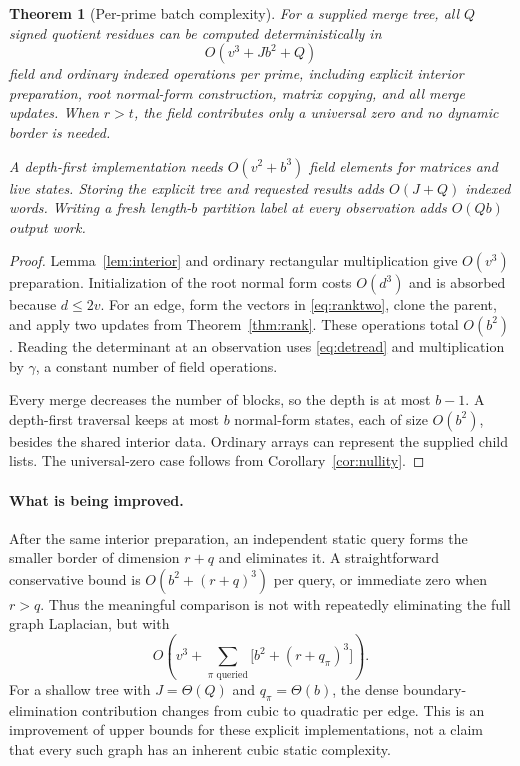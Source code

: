 \documentclass[11pt,letterpaper]{article}
\newtheorem{theorem}{Theorem}[section]
\theoremstyle{definition}\newtheorem{definition}[theorem]{Definition}
\theoremstyle{remark}\newtheorem{remark}[theorem]{Remark}
\begin{document}
\begin{theorem}[Per-prime batch complexity]
\label{thm:batch}
For a supplied merge tree, all $Q$ signed quotient residues can be computed deterministically in
\begin{equation}
 O(v^3+Jb^2+Q)
 \label{eq:batch}
\end{equation}
field and ordinary indexed operations per prime, including explicit interior preparation, root normal-form construction, matrix copying, and all merge updates. When $r>t$, the field contributes only a universal zero and no dynamic border is needed.

A depth-first implementation needs $O(v^2+b^3)$ field elements for matrices and live states. Storing the explicit tree and requested results adds $O(J+Q)$ indexed words. Writing a fresh length-$b$ partition label at every observation adds $O(Qb)$ output work.
\end{theorem}
\begin{proof}
Lemma~\ref{lem:interior} and ordinary rectangular multiplication give $O(v^3)$ preparation. Initialization of the root normal form costs $O(d^3)$ and is absorbed because $d\leq2v$. For an edge, form the vectors in \eqref{eq:ranktwo}, clone the parent, and apply two updates from Theorem~\ref{thm:rank}. These operations total $O(b^2)$. Reading the determinant at an observation uses \eqref{eq:detread} and multiplication by $\gamma$, a constant number of field operations.

Every merge decreases the number of blocks, so the depth is at most $b-1$. A depth-first traversal keeps at most $b$ normal-form states, each of size $O(b^2)$, besides the shared interior data. Ordinary arrays can represent the supplied child lists. The universal-zero case follows from Corollary~\ref{cor:nullity}.
\end{proof}

\paragraph{What is being improved.}
After the same interior preparation, an independent static query forms the smaller border of dimension $r+q$ and eliminates it. A straightforward conservative bound is $O(b^2+(r+q)^3)$ per query, or immediate zero when $r>q$. Thus the meaningful comparison is not with repeatedly eliminating the full graph Laplacian, but with
\begin{equation}
 O\!\left(v^3+\sum_{\pi\text{ queried}}\bigl[b^2+(r+q_\pi)^3\bigr]\right).
 \label{eq:static}
\end{equation}
For a shallow tree with $J=\Theta(Q)$ and $q_\pi=\Theta(b)$, the dense boundary-elimination contribution changes from cubic to quadratic per edge. This is an improvement of upper bounds for these explicit implementations, not a claim that every such graph has an inherent cubic static complexity.
\end{document}
